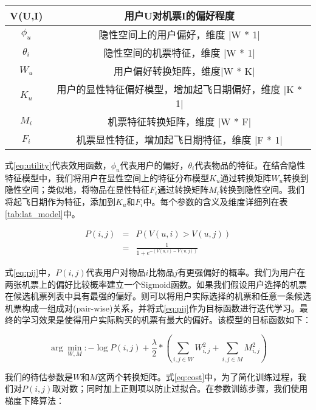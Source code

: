 \begin{table}[!hpb]
  \centering
  \begin{tabular}{|c|c|} \hline 
V(U,I) & 用户U对机票I的偏好程度 \\ \hline
$\phi_u$ & 隐性空间上的用户偏好，维度 |W * 1| \\ \hline
$\theta_i$ & 隐性空间的机票特征，维度 |W * 1| \\ \hline
$W_u$ &　用户偏好转换矩阵，维度|W * K| \\ \hline
$K_u$ & 用户的显性特征偏好模型，增加起飞日期偏好，维度 |K * 1| \\ \hline
$M_i$ & 机票特征转换矩阵，维度 |W * F| \\ \hline
$F_i$ & 机票显性特征，增加起飞日期特征，维度 |F * 1| \\ \hline
  \end{tabular}
\end{table}

式\ref{eq:utility}代表效用函数，$\phi_u$代表用户的偏好，$\theta_i$代表物品的特征。在结合隐性特征模型中，我们将用户在显性空间上的特征分布模型$K_u$通过转换矩阵$W_u$转换到隐性空间；类似地，将物品在显性特征$F_i$通过转换矩阵$M_i$转换到隐性空间。我们将起飞日期作为特征，添加到$K_u$和$F_i$中。每个参数的含义及维度详细列在表\ref{tab:lat_model}中。

\begin{eqnarray}
\label{eq:pij}
    P(i,j) & = & P(V(u,i) > V(u,j)) \nonumber \\
	 & = &\frac{1}{1+e^{-(V(u,i) - V(u,j))}}
\end{eqnarray}

式\ref{eq:pij}中，$P(i,j)$代表用户对物品$i$比物品$j$有更强偏好的概率。我们为用户在两张机票上的偏好比较概率建立一个Sigmoid函数\cite{yonaba2010comparing}。如果我们假设用户选择的机票在候选机票列表中具有最强的偏好。则可以将用户实际选择的机票和任意一条候选机票构成一组成对(pair-wise)关系，并将式\ref{eq:pij}作为目标函数进行迭代学习。最终的学习效果是使得用户实际购买的机票有最大的偏好。该模型的目标函数如下：

\begin{equation}
\label{eq:cost}
  \arg\min_{W,M} : - \log P(i,j) + \frac{\lambda}{2} * (\sum_{i,j \in W}W_{i,j}^2 + \sum_{i,j \in M}M_{i,j}^2)
\end{equation}

我们的待估参数是$W$和$M$这两个转换矩阵。式\ref{eq:cost}中，为了简化训练过程，我们对$P(i,j)$取对数；同时加上正则项以防止过拟合。在参数训练步骤，我们使用梯度下降算法：

